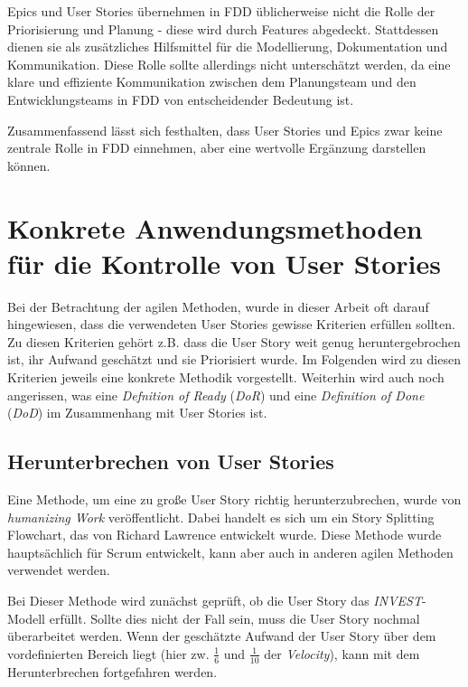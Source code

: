 \documentclass[acmtog]{acmart}
\begin{document}
Epics und User Stories übernehmen in FDD üblicherweise nicht die Rolle der Priorisierung und Planung - diese wird durch Features abgedeckt. Stattdessen dienen sie als zusätzliches Hilfsmittel für die Modellierung, Dokumentation und Kommunikation. Diese Rolle sollte allerdings nicht unterschätzt werden, da eine klare und effiziente Kommunikation zwischen dem Planungsteam und den Entwicklungsteams in FDD von entscheidender Bedeutung ist.

Zusammenfassend lässt sich festhalten, dass User Stories und Epics zwar keine zentrale Rolle in FDD einnehmen, aber eine wertvolle Ergänzung darstellen können.

\section{Konkrete Anwendungsmethoden für die Kontrolle von User Stories}

Bei der Betrachtung der agilen Methoden, wurde in dieser Arbeit oft darauf hingewiesen, dass die verwendeten User Stories gewisse Kriterien
erfüllen sollten. Zu diesen Kriterien gehört z.B. dass die User Story weit genug heruntergebrochen ist, ihr Aufwand geschätzt und sie Priorisiert
wurde. Im Folgenden wird zu diesen Kriterien jeweils eine konkrete Methodik vorgestellt. Weiterhin wird auch noch angerissen, was eine \emph{Defnition of
	Ready}  (\emph{DoR}) und eine \emph{Definition of Done} (\emph{DoD}) im Zusammenhang mit User Stories ist.

\subsection{Herunterbrechen von User Stories} \label{sec:breakedown}

Eine Methode, um eine zu große User Story richtig herunterzubrechen, wurde von \emph{humanizing Work} veröffentlicht. Dabei handelt es sich um ein Story
Splitting Flowchart, das von Richard Lawrence entwickelt wurde. Diese Methode wurde hauptsächlich für Scrum entwickelt, kann aber auch
in anderen agilen Methoden verwendet werden. \cite{humanizingwork}

Bei Dieser Methode wird zunächst geprüft, ob die User Story das \emph{INVEST}-Modell erfüllt. Sollte dies nicht der Fall sein, muss die User Story nochmal
überarbeitet werden. Wenn der geschätzte Aufwand der User Story über dem vordefinierten Bereich liegt (hier zw. \( \frac{1}{6} \) und \( \frac{1}{10} \) der \emph{Velocity}), kann mit dem Herunterbrechen
fortgefahren werden. \cite{humanizingwork}
\end{document}
